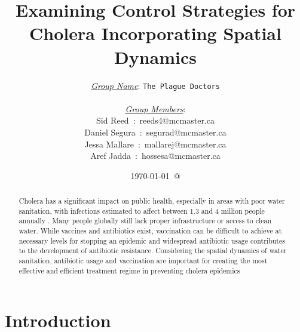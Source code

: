 \documentclass[12pt]{article}\usepackage[]{graphicx}\usepackage[]{color}
\begin{document}
\title{Examining Control Strategies for Cholera Incorporating Spatial Dynamics}
\author{
\underline{\emph{Group Name}}: \texttt{{\color{blue}The Plague Doctors}}\\\\
\underline{\emph{Group Members}}:\\
         Sid Reed\ :\ {\color{blue}reeds4@mcmaster.ca}\\
         Daniel Segura\ :\ {\color{blue}segurad@mcmaster.ca}\\
         Jessa Mallare\ :\ {\color{blue}mallarej@mcmaster.ca}\\
         Aref Jadda\ :\ {\color{blue}hossesa@mcmaster.ca}\\
}
\date{\today\ @ \thistime}
\maketitle

\linenumbers

\begin{abstract}
    Cholera has a significant impact on public health, especially in areas with poor water sanitation, with infections estimated to affect between 1.3 and 4 million people annually \citep{link18}.
    Many people globally still lack proper infrastructure or access to clean water\citep{link19}.
    While vaccines and antibiotics exist, vaccination can be difficult to achieve at necessary levels for stopping an epidemic and widespread antibiotic usage contributes to the development of antibiotic resistance.
    Considering the spatial dynamics of water sanitation, antibiotic usage and vaccination are important for creating the most effective and efficient treatment regime in preventing cholera epidemics
\end{abstract}

\clearpage
\tableofcontents
\clearpage

\section{Introduction}
\end{document}

